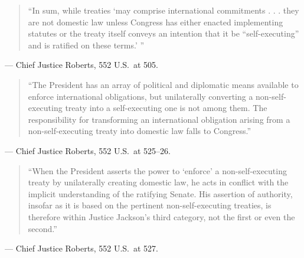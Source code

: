 \documentclass[12pt]{article}
\begin{document}
\begin{quote}
``In sum, while treaties `may comprise international commitments . . . they are not domestic law unless Congress has either enacted implementing statutes or the treaty itself conveys an intention that it be ``self-executing'' and is ratified on these terms.' ''
\end{quote}
\noindent --- Chief Justice Roberts, 552 U.S.\ at 505.

\begin{quote}
``The President has an array of political and diplomatic means available to enforce international obligations, but unilaterally converting a non-self-executing treaty into a self-executing one is not among them. The responsibility for transforming an international obligation arising from a non-self-executing treaty into domestic law falls to Congress.''
\end{quote}
\noindent --- Chief Justice Roberts, 552 U.S.\ at 525--26.

\begin{quote}
``When the President asserts the power to `enforce' a non-self-executing treaty by unilaterally creating domestic law, he acts in conflict with the implicit understanding of the ratifying Senate. His assertion of authority, insofar as it is based on the pertinent non-self-executing treaties, is therefore within Justice Jackson's third category, not the first or even the second.''
\end{quote}
\noindent --- Chief Justice Roberts, 552 U.S.\ at 527.
\end{document}
